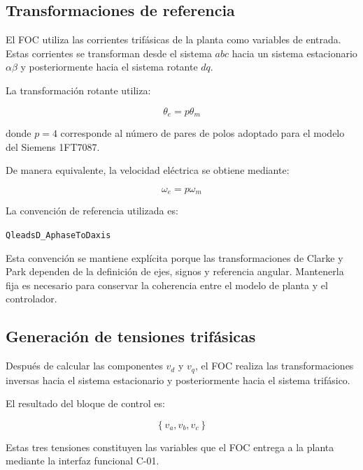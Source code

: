 \subsection{Transformaciones de referencia}

El FOC utiliza las corrientes trifásicas de la planta como variables de entrada. Estas corrientes se transforman desde el sistema $abc$ hacia un sistema estacionario $\alpha\beta$ y posteriormente hacia el sistema rotante $dq$.

La transformación rotante utiliza:

\begin{equation}
\theta_e=p\theta_m
\end{equation}

donde $p=4$ corresponde al número de pares de polos adoptado para el modelo del Siemens 1FT7087.

De manera equivalente, la velocidad eléctrica se obtiene mediante:

\begin{equation}
\omega_e=p\omega_m
\end{equation}

La convención de referencia utilizada es:

\begin{center}
\texttt{QleadsD\_AphaseToDaxis}
\end{center}

Esta convención se mantiene explícita porque las transformaciones de Clarke y Park dependen de la definición de ejes, signos y referencia angular. Mantenerla fija es necesario para conservar la coherencia entre el modelo de planta y el controlador.

\subsection{Generación de tensiones trifásicas}

Después de calcular las componentes $v_d$ y $v_q$, el FOC realiza las transformaciones inversas hacia el sistema estacionario y posteriormente hacia el sistema trifásico.

El resultado del bloque de control es:

\begin{equation}
\left\{v_a,v_b,v_c\right\}
\end{equation}

Estas tres tensiones constituyen las variables que el FOC entrega a la planta mediante la interfaz funcional C-01.

